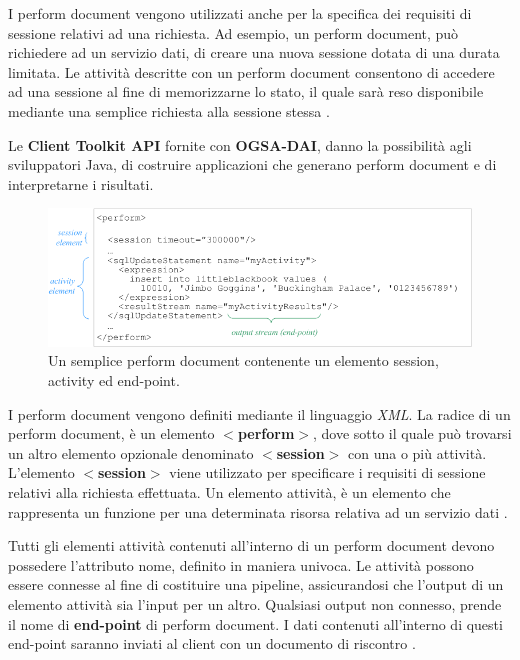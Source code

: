 \documentclass[11pt]{article}
\begin{document}
I perform document vengono utilizzati anche per la specifica dei requisiti di sessione relativi ad una richiesta. Ad esempio, un perform document, può richiedere ad un servizio dati, di creare una nuova sessione dotata di una durata limitata. Le attività descritte con un perform document consentono di accedere ad una sessione al fine di memorizzarne lo stato, il quale sarà reso disponibile mediante una semplice richiesta alla sessione stessa \cite{ogsadai}.

Le \textbf{Client Toolkit API} fornite con \textbf{OGSA-DAI}, danno la possibilità agli sviluppatori Java, di costruire applicazioni che generano perform document e di interpretarne i risultati.

\begin{figure}[H]
	\centering
	\includegraphics[scale=0.60]{images/PerformDocument.png}
	\caption{Un semplice perform document contenente un elemento session, activity ed end-point.}
	\label{admirearch}
\end{figure}

I perform document vengono definiti mediante il linguaggio \emph{XML}. La radice di un perform document, è un elemento \textbf{$<$perform$>$}, dove sotto il quale può trovarsi un altro elemento opzionale denominato \textbf{$<$session$>$} con una o più attività. L'elemento \textbf{$<$session$>$} viene utilizzato per specificare i requisiti di sessione relativi alla richiesta effettuata. Un elemento attività, è un elemento che rappresenta un funzione per una determinata risorsa relativa ad un servizio dati \cite{ogsadai}. 

Tutti gli elementi attività contenuti all'interno di un perform document devono possedere l'attributo nome, definito in maniera univoca. Le attività possono essere connesse al fine di costituire una pipeline, assicurandosi che  l'output di un elemento attività sia l'input per un altro. Qualsiasi output non connesso, prende il nome di \textbf{end-point} di perform document. I dati contenuti all'interno di questi end-point saranno inviati al client con un documento di riscontro \cite{ogsadai}.
\end{document}
